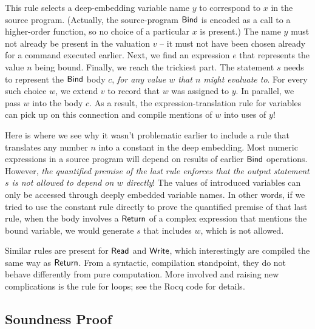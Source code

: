 \documentclass{amsbook}
\theoremstyle{definition}
\theoremstyle{remark}
\numberwithin{section}{chapter}
\numberwithin{equation}{chapter}
\begin{document}
This rule selects a deep-embedding variable name $y$ to correspond to $x$ in the source program.
(Actually, the source-program $\mathsf{Bind}$ is encoded as a call to a higher-order function, so no choice of a particular $x$ is present.)
The name $y$ must not already be present in the valuation $v$ -- it must not have been chosen already for a command executed earlier.
Next, we find an expression $e$ that represents the value $n$ being bound.
Finally, we reach the trickiest part.
The statement $s$ needs to represent the $\mathsf{Bind}$ body $c$, \emph{for any value $w$ that $n$ might evaluate to}.
For every such choice $w$, we extend $v$ to record that $w$ was assigned to $y$.
In parallel, we pass $w$ into the body $c$.
As a result, the expression-translation rule for variables can pick up on this connection and compile mentions of $w$ into uses of $y$!

Here is where we see why it wasn't problematic earlier to include a rule that translates any number $n$ into a constant in the deep embedding.
Most numeric expressions in a source program will depend on results of earlier $\mathsf{Bind}$ operations.
However, \emph{the quantified premise of the last rule enforces that the output statement $s$ is not allowed to depend on $w$ directly}!
The values of introduced variables can only be accessed through deeply embedded variable names.
In other words, if we tried to use the constant rule directly to prove the quantified premise of that last rule, when the body involves a $\mathsf{Return}$ of a complex expression that mentions the bound variable, we would generate $s$ that includes $w$, which is not allowed.

Similar rules are present for $\mathsf{Read}$ and $\mathsf{Write}$, which interestingly are compiled the same way as $\mathsf{Return}$.
From a syntactic, compilation standpoint, they do not behave differently from pure computation.
More involved and raising new complications is the rule for loops; see the Rocq code for details.

\subsection{Soundness Proof}
\end{document}
